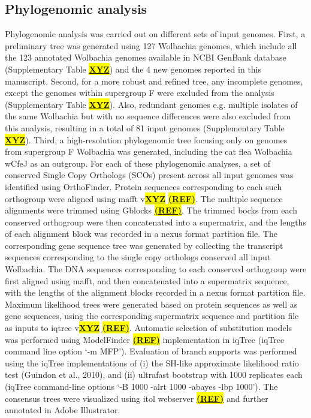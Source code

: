\documentclass[10pt, a4paper, twocolumn]{article} %
\begin{document}
\subsection{Phylogenomic analysis }
Phylogenomic analysis was carried out on different sets of input genomes. First, a preliminary tree was generated using 127 Wolbachia genomes, which include all the 123 annotated Wolbachia genomes available in NCBI GenBank database (Supplementary Table \underline{\textbf{\colorbox{Yellow}{XYZ}}}) and the 4 new genomes reported in this manuscript. Second, for a more robust and refined tree, any incomplete genomes, except the genomes within supergroup F were excluded from the analysis (Supplementary Table \underline{\textbf{\colorbox{Yellow}{XYZ}}}).  Also, redundant genomes e.g.  multiple isolates of the same Wolbachia but with no sequence differences were also excluded from this analysis, resulting in a total of 81 input genomes (Supplementary Table \underline{\textbf{\colorbox{Yellow}{XYZ}}}). Third, a high-resolution phylogenomic tree focusing only on genomes from supergroup F Wolbachia was generated, including the cat flea Wolbachia wCfeJ as an outgroup. 
For each of these phylogenomic analyses, a set of conserved Single Copy Orthologs (SCOs) present across all input genomes was identified using OrthoFinder. Protein sequences corresponding to each such orthogroup were aligned using mafft v\underline{\textbf{\colorbox{Yellow}{XYZ}}} \underline{\textbf{\colorbox{Yellow}{(REF)}}}. The multiple sequence alignments were trimmed using Gblocks \underline{\textbf{\colorbox{Yellow}{(REF)}}}. The trimmed bocks from each conserved orthogroup were then concatenated into a supermatrix, and the lengths of each alignment block was recorded in a nexus format partition file. The corresponding gene sequence tree was generated by collecting the transcript sequences corresponding to the single copy orthologs conserved all input Wolbachia. The DNA sequences corresponding to each conserved orthogroup were first aligned using mafft, and then concatenated into a supermatrix sequence, with the lengths of the alignment blocks recorded in a nexus format partition file. Maximum likelihood trees were generated based on protein sequences as well as gene sequences, using the corresponding supermatrix sequence and partition file as inputs to iqtree v\underline{\textbf{\colorbox{Yellow}{XYZ}}} \underline{\textbf{\colorbox{Yellow}{(REF)}}}.  Automatic selection of substitution models was performed using ModelFinder \underline{\textbf{\colorbox{Yellow}{(REF)}}} implementation in iqTree (iqTree command line option ‘-m MFP’). Evaluation of branch supports was performed using the iqTree implementations of (i) the SH-like approximate likelihood ratio test (Guindon et al., 2010), and (ii) ultrafast bootstrap with 1000 replicates each (iqTree command-line options ‘-B 1000 -alrt 1000 -abayes -lbp 1000’). The consensus trees were visualized using itol webserver \underline{\textbf{\colorbox{Yellow}{(REF)}}} and further annotated in Adobe Illustrator.     
\end{document}
